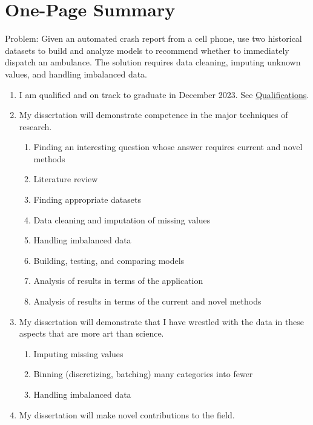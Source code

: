 \section*{One-Page Summary}

Problem:  Given an automated crash report from a cell phone, use two historical datasets to build and analyze models to recommend whether to immediately dispatch an ambulance.  The solution requires data cleaning, imputing unknown values, and handling imbalanced data.

\begin{enumerate}
	\item I am qualified and on track to graduate in December 2023.  See \hyperref[sec:Qualifications]{Qualifications}.
	\item My dissertation will demonstrate competence in the major techniques of research.
	\begin{enumerate}[label=\alph*., partopsep=0pt,topsep=0pt,parsep=0pt]
		\item Finding an interesting question whose answer requires current and novel methods
		\item Literature review
		\item Finding appropriate datasets
		\item Data cleaning and imputation of missing values
		\item Handling imbalanced data
		\item Building, testing, and comparing models
		\item Analysis of results in terms of the application
		\item Analysis of results in terms of the current and novel methods
	\end{enumerate}
	\item My dissertation will demonstrate that I have wrestled with the data in these aspects that are more art than science.
	\begin{enumerate}[label=\alph*., partopsep=0pt,topsep=0pt,parsep=0pt]
		\item Imputing missing values
		\item Binning (discretizing, batching) many categories into fewer
		\item Handling imbalanced data
	\end{enumerate}
	\item My dissertation will make novel contributions to the field.
	\begin{enumerate}[label=\alph*., partopsep=0pt,topsep=0pt,parsep=0pt]

\end{enumerate}
\end{enumerate}
